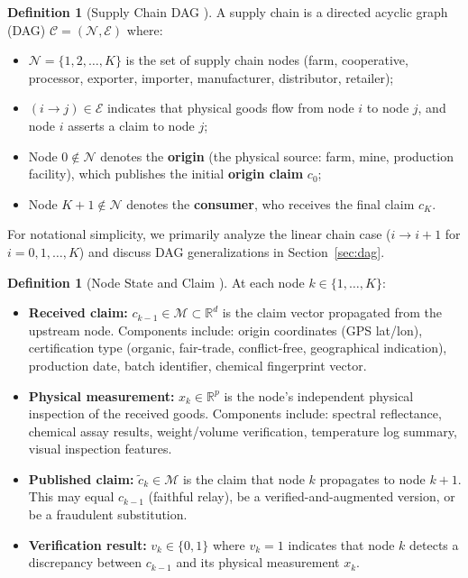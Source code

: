 \documentclass[11pt,a4paper]{article}
\theoremstyle{definition}
\newtheorem{definition}[theorem]{Definition}
\theoremstyle{remark}
\newcommand{\R}{\mathbb{R}}
\newcommand{\chain}{\mathcal{C}}
\newcommand{\nodeSet}{\mathcal{N}}
\newcommand{\claimSpace}{\mathcal{M}}
\begin{document}
\begin{definition}[Supply Chain DAG ]
\label{def:chain}
A supply chain is a directed acyclic graph (DAG) $\chain = (\nodeSet, \mathcal{E})$ where:
\begin{itemize}
    \item $\nodeSet = \{1, 2, \ldots, K\}$ is the set of supply chain nodes (farm, cooperative, processor, exporter, importer, manufacturer, distributor, retailer);
    \item $(i \to j) \in \mathcal{E}$ indicates that physical goods flow from node $i$ to node $j$, and node $i$ asserts a claim to node $j$;
    \item Node $0 \notin \nodeSet$ denotes the \textbf{origin} (the physical source: farm, mine, production facility), which publishes the initial \textbf{origin claim} $c_0$;
    \item Node $K+1 \notin \nodeSet$ denotes the \textbf{consumer}, who receives the final claim $c_K$.
\end{itemize}
\end{definition}

For notational simplicity, we primarily analyze the linear chain case ($i \to i+1$ for $i = 0, 1, \ldots, K$) and discuss DAG generalizations in Section~\ref{sec:dag}.

\begin{definition}[Node State and Claim ]
\label{def:node_state}
At each node $k \in \{1, \ldots, K\}$:
\begin{itemize}
    \item \textbf{Received claim:} $c_{k-1} \in \claimSpace \subset \R^d$ is the claim vector propagated from the upstream node. Components include: origin coordinates (GPS lat/lon), certification type (organic, fair-trade, conflict-free, geographical indication), production date, batch identifier, chemical fingerprint vector.
    \item \textbf{Physical measurement:} $x_k \in \R^p$ is the node's independent physical inspection of the received goods. Components include: spectral reflectance, chemical assay results, weight/volume verification, temperature log summary, visual inspection features.
    \item \textbf{Published claim:} $\tilde{c}_k \in \claimSpace$ is the claim that node $k$ propagates to node $k+1$. This may equal $c_{k-1}$ (faithful relay), be a verified-and-augmented version, or be a fraudulent substitution.
    \item \textbf{Verification result:} $v_k \in \{0, 1\}$ where $v_k = 1$ indicates that node $k$ detects a discrepancy between $c_{k-1}$ and its physical measurement $x_k$.
\end{itemize}
\end{definition}
\end{document}
